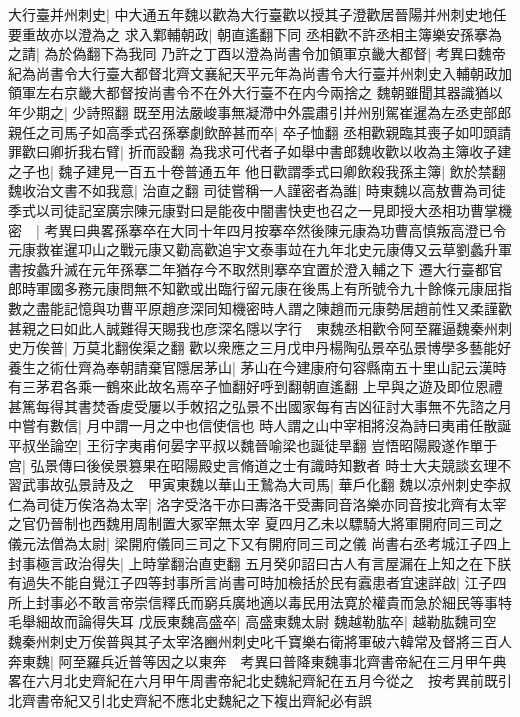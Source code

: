 大行臺并州刺史|{
	中大通五年魏以歡為大行臺歡以授其子澄歡居晉陽并州刺史地任要重故亦以澄為之}
求入鄴輔朝政|{
	朝直遙翻下同}
丞相歡不許丞相主簿樂安孫搴為之請|{
	為於偽翻下為我同}
乃許之丁酉以澄為尚書令加領軍京畿大都督|{
	考異曰魏帝紀為尚書令大行臺大都督北齊文襄紀天平元年為尚書令大行臺并州刺史入輔朝政加領軍左右京畿大都督按尚書令不在外大行臺不在内今兩捨之}
魏朝雖聞其器識猶以年少期之|{
	少詩照翻}
既至用法嚴峻事無凝滯中外震肅引并州别駕崔暹為左丞吏部郎親任之司馬子如高季式召孫搴劇飲醉甚而卒|{
	卒子恤翻}
丞相歡親臨其喪子如叩頭請罪歡曰卿折我右臂|{
	折而設翻}
為我求可代者子如舉中書郎魏收歡以收為主簿收子建之子也|{
	魏子建見一百五十卷普通五年}
他日歡謂季式曰卿飲殺我孫主簿|{
	飲於禁翻}
魏收治文書不如我意|{
	治直之翻}
司徒嘗稱一人謹密者為誰|{
	時東魏以高敖曹為司徒}
季式以司徒記室廣宗陳元康對曰是能夜中闇書快吏也召之一見即授大丞相功曹掌機密　|{
	考異曰典畧孫搴卒在大同十年四月按搴卒然後陳元康為功曹高慎叛高澄已令元康救崔暹卭山之戰元康又勸高歡追宇文泰事竝在九年北史元康傳又云草劉蠡升軍書按蠡升滅在元年孫搴二年猶存今不取然則搴卒宜置於澄入輔之下}
遷大行臺都官郎時軍國多務元康問無不知歡或出臨行留元康在後馬上有所號令九十餘條元康屈指數之盡能記憶與功曹平原趙彦深同知機密時人謂之陳趙而元康勢居趙前性又柔謹歡甚親之曰如此人誠難得天賜我也彦深名隱以字行　東魏丞相歡令阿至羅逼魏秦州刺史万俟普|{
	万莫北翻俟渠之翻}
歡以衆應之三月戊申丹楊陶弘景卒弘景博學多藝能好養生之術仕齊為奉朝請棄官隱居茅山|{
	茅山在今建康府句容縣南五十里山記云漢時有三茅君各乘一鶴來此故名焉卒子恤翻好呼到翻朝直遙翻}
上早與之遊及即位恩禮甚篤每得其書焚香䖍受屢以手敇招之弘景不出國家每有吉凶征討大事無不先諮之月中嘗有數信|{
	月中謂一月之中也信使信也}
時人謂之山中宰相將沒為詩曰夷甫任散誕平叔坐論空|{
	王衍字夷甫何晏字平叔以魏晉喻梁也誕徒旱翻}
豈悟昭陽殿遂作單于宫|{
	弘景傳曰後侯景篡果在昭陽殿史言脩道之士有識時知數者}
時士大夫競談玄理不習武事故弘景詩及之　甲寅東魏以華山王鷙為大司馬|{
	華戶化翻}
魏以凉州刺史李叔仁為司徒万俟洛為太宰|{
	洛字受洛干亦曰夀洛干受夀同音洛樂亦同音按北齊有太宰之官仍晉制也西魏用周制置大冢宰無太宰}
夏四月乙未以驃騎大將軍開府同三司之儀元法僧為太尉|{
	梁開府儀同三司之下又有開府同三司之儀}
尚書右丞考城江子四上封事極言政治得失|{
	上時掌翻治直吏翻}
五月癸卯詔曰古人有言屋漏在上知之在下朕有過失不能自覺江子四等封事所言尚書可時加檢括於民有蠧患者宜速詳啟|{
	江子四所上封事必不敢言帝崇信釋氏而窮兵廣地適以毒民用法寛於權貴而急於細民等事特毛舉細故而論得失耳}
戊辰東魏高盛卒|{
	高盛東魏太尉}
魏越勒肱卒|{
	越勒肱魏司空}
魏秦州刺史万俟普與其子太宰洛豳州刺史叱千寶樂右衛將軍破六韓常及督將三百人奔東魏|{
	阿至羅兵近普等因之以東奔　考異曰普降東魏事北齊書帝紀在三月甲午典畧在六月北史齊紀在六月甲午周書帝紀北史魏紀齊紀在五月今從之　按考異前既引北齊書帝紀又引北史齊紀不應北史魏紀之下複出齊紀必有誤}
